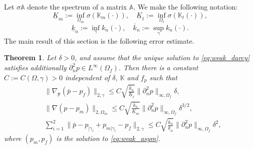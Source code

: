 \documentclass[a4paper]{article}
\newtheorem{theorem}{Theorem}
\def\vc#1{\mathbf{\boldsymbol{#1}}}     %
\def\tn#1{{\mathbb{#1}}}    %
\def\norm#1{\|#1\|}
\def\yy{{\vc y}}
\begin{document}
Let $\sigma\tn A$ denote the spectrum of a matrix $\tn A$.
We make the following notation:
\[ \underline K_m := \inf_{\Omega_m}\sigma(\tn K_m(\cdot)), \quad \underline K_t := \inf_{\Omega_t}\sigma(\tn K_t(\cdot)), \]
\[ \underline k_n := \inf_{\gamma}k_n(\cdot), \quad \overline k_n:=\sup_{\gamma}k_n(\cdot). \]
The main result of this section is the following error estimate.
\begin{theorem}
\label{th:error_estimate}
Let $\delta>0$, and assume that the unique solution to \eqref{eq:weak_darcy} satisfies additionally $\partial_n^2 p\in L^\infty(\Omega_f)$.
Then there is a constant $C:=C(\Omega,\gamma)>0$ independent of $\delta$, $\tn K$ and $f_p$ such that
\begin{subequations}
\label{eq:error_estimates_delta}
\begin{align}
&\norm{\nabla_\yy(\bar p- p_f)}_{2,\gamma} \le C\sqrt{\frac{\overline k_n}{\underline K_t}}\norm{\partial_n^2 p}_{\infty,\Omega_f}\delta,\\
&\norm{\nabla(p-p_m)}_{2,\Omega_m} \le C\sqrt{\frac{\overline k_n}{\underline K_m}}\norm{\partial_n^2 p}_{\infty,\Omega_f}\delta^{3/2},\\
&\sum_{i=1}^2\norm{\bar p-p_{|\gamma_i}+p_{m|\gamma_i}-p_f}_{2,\gamma} \le C\sqrt{\frac{\overline k_n}{\underline k_n}}\norm{\partial_n^2 p}_{\infty,\Omega_f}\delta^2,
\end{align}
\end{subequations}
where $(p_m,p_f)$ is the solution to \eqref{eq:weak_asym}.
\end{theorem}
\end{document}
